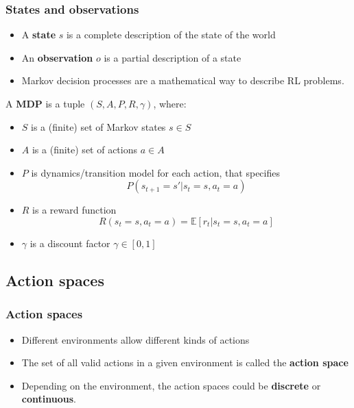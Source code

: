 \documentclass[10pt]{beamer}
\newcommand{\E}{{\mathbb E}}
\begin{document}
\begin{frame}
\frametitle{States and observations}

\begin{itemize}

\item A \textbf{state} $s$ is a complete description of the state of the world
\item An \textbf{observation} $o$ is a partial description of a state
\item Markov decision processes are a mathematical way to describe RL problems. 

\end{itemize}

\begin{definition}
	A \textbf{MDP} is a tuple $(S,A, P, R, \gamma)$, where:
	\begin{itemize}
		\item $S$ is a (finite) set of Markov states $s \in S$
		\item $A$ is a (finite) set of actions $a \in A$
		\item $P$ is dynamics/transition model for each action, that specifies
		\begin{equation}
			P(s_{t+1} =s'|s_t =s,a_t =a)	
		\end{equation}
		\item $R$ is a reward function
		\begin{equation}
			R(s_t =s,a_t =a)=\E[r_t|s_t =s,a_t =a]	
		\end{equation}
		
		\item $\gamma$ is a discount factor $\gamma \in [0,1]$
	\end{itemize}
\end{definition}

\end{frame}


\subsection{Action spaces}

\begin{frame}
	\frametitle{Action spaces}
	\begin{itemize}
		\item Different environments allow different kinds of actions
		\item The set of all valid actions in a given environment is called the \textbf{action space}
		\item Depending on the environment, the action spaces could be \textbf{discrete} or \textbf{continuous}.
	\end{itemize}
\end{frame}
\end{document}
